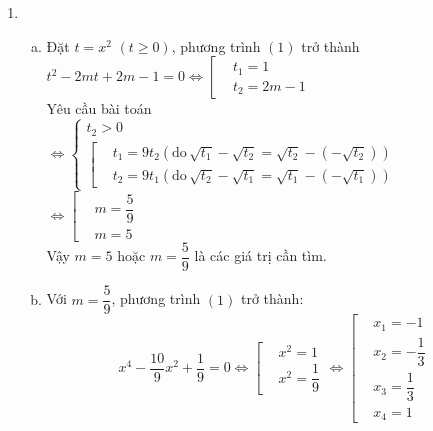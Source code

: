 \begin{ex}
{\begin{enumerate}[\bf 1)]
\begin{itemize}
				\item $x^2 + xy + y^2 = 2(x + y) - 4 \Leftrightarrow (x + y)^2 - 2(x + y) - xy + 4 = 0$.\\
						Đặt $\begin{cases} S = x + y \\ P = xy \end{cases}$, ta được $\begin{cases} S^2 \geq 4P \\ S^2 - 2S - P + 4 = 0 \end{cases}$\\
						$\Rightarrow S^2 \geq 4(S^2 - 2S + 4) \Rightarrow 3\left(S - \dfrac{4}{3}\right)^2 + \dfrac{32}{3} \leq 0$ (không xảy ra). 
			\end{itemize}
			Vậy hệ phương trình đã cho có tập nghiệm $S = \left\lbrace (1; 1), \left(\dfrac{1 + \sqrt{5}}{2}; \dfrac{1 + \sqrt{5}}{2}\right), \left(\dfrac{1 - \sqrt{5}}{2}; \dfrac{1 - \sqrt{5}}{2}\right) \right\rbrace $.
	\item \begin{enumerate}[a)]
				\item Đặt $t = x^2$ $(t \geq 0)$, phương trình $(1)$ trở thành $t^2 - 2mt + 2m - 1 = 0 \Leftrightarrow \left[\begin{aligned} &t_1 = 1 \\ &t_2 = 2m - 1\end{aligned}\right.$\\
						Yêu cầu bài toán $\Leftrightarrow \begin{cases} t_2 > 0 \\ \left[\begin{aligned} &t_1 = 9t_2 \left(\mbox{do}\, \sqrt{t_1} - \sqrt{t_2} = \sqrt{t_2} - \left(-\sqrt{t_2}\right)\right) \\ &t_2 = 9t_1 \left(\mbox{do}\, \sqrt{t_2} - \sqrt{t_1} = \sqrt{t_1} - \left(-\sqrt{t_1}\right)\right)\end{aligned}\right. \end{cases}$\\
						\phantom{Yêu cầu bài toán }$\Leftrightarrow \left[\begin{aligned} &m = \dfrac{5}{9} \\ &m = 5\end{aligned}\right.$\\
						Vậy $m = 5$ hoặc $m = \dfrac{5}{9}$ là các giá trị cần tìm.
				\item Với $m = \dfrac{5}{9}$, phương trình $(1)$ trở thành: $$x^4 - \dfrac{10}{9}x^2 + \dfrac{1}{9} = 0 \Leftrightarrow \left[\begin{aligned} &x^2 = 1 \\ &x^2 = \dfrac{1}{9}\end{aligned}\right. \Leftrightarrow \left[\begin{aligned} &x_1 = -1 \\ &x_2 = -\dfrac{1}{3} \\ &x_3 = \dfrac{1}{3} \\ &x_4 = 1\end{aligned}\right.$$

\end{enumerate}
\end{enumerate}}
\end{ex}
